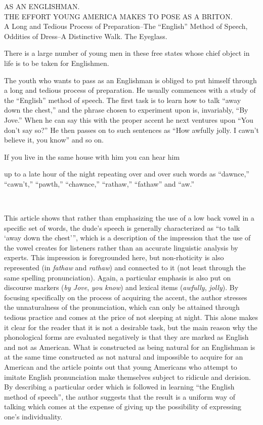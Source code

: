 \begin{ipquote}
\begin{center}
AS AN ENGLISHMAN.\\
THE EFFORT YOUNG AMERICA MAKES TO POSE AS A BRITON.\\
A Long and Tedious Process of Preparation–The “English” Method of Speech, Oddities of Dress–A Distinctive Walk. The Eyeglass.
\end{center}
There is a large number of young men in these free states whose chief object in life is to be taken for Englishmen.

{The youth who wants to pass as an Englishman is obliged to put himself through a long and tedious process of preparation. He usually commences with a study of the “English” method of speech. The first task is to learn how to talk “away down the chest,” and the phrase chosen to experiment upon is, invariably, “By Jove.” When he can say this with the proper accent he next ventures upon “You don’t say so?” He then passes on to such sentences as “How awfully jolly. I cawn’t believe it, you know” and so on.

\centering {[...]}

If you live in the same house with him you can hear him} {up to a late hour of the night repeating over and over such words as “dawnce,” “cawn’t,” “pawth,” “chawnce,” “rathaw,” “fathaw” and “aw.” 

\centering {[...]}\\
}
\end{ipquote}

This article shows that rather than emphasizing the use of a low back vowel in a specific set of words, the dude’s speech is generally characterized as “to talk ‘away down the chest’”, which is a description of the impression that the use of the vowel creates for listeners rather than an accurate linguistic analysis by experts. This impression is foregrounded here, but non-rhoticity is also represented (in \emph{fathaw} and \emph{rathaw}) and connected to it (not least through the same spelling pronunciation). Again, a particular emphasis is also put on discourse markers (\emph{by Jove}, \emph{you know}) and lexical items (\emph{awfully}, \emph{jolly}). By focusing specifically on the process of acquiring the accent, the author stresses the unnaturalness of the pronunciation, which can only be attained through tedious practice and comes at the price of not sleeping at night. This alone makes it clear for the reader that it is not a desirable task, but the main reason why the phonological forms are evaluated negatively is that they are marked as English and not as American. What is constructed as being natural for an Englishman is at the same time constructed as not natural and impossible to acquire for an American and the article points out that young Americans who attempt to imitate English pronunciation make themselves subject to ridicule and derision. By describing a particular order which is followed in learning “the English method of speech”, the author suggests that the result is a uniform way of talking which comes at the expense of giving up the possibility of expressing one’s individuality.

